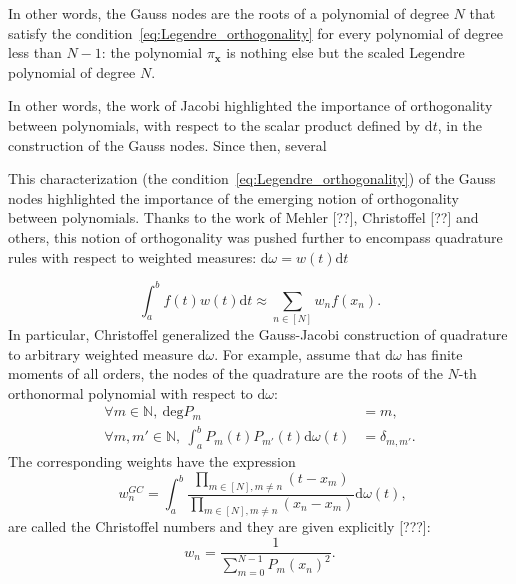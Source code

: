 \documentclass[twoside,11pt]{book}
\begin{document}


 In other words, the Gauss nodes are the roots of a polynomial of degree $N$ that satisfy the condition~\eqref{eq:Legendre_orthogonality} for every polynomial of degree less than $N-1$: the polynomial $\pi_{\bm{x}}$ is nothing else but the scaled Legendre polynomial of degree $N$.

 In other words, the work of Jacobi highlighted the importance of orthogonality 
between polynomials, with respect to the scalar product defined by $\mathrm{d}t$, in the construction of the Gauss nodes. Since then, several 


 This characterization (the condition~\eqref{eq:Legendre_orthogonality}) of the Gauss nodes highlighted the importance of the emerging notion of orthogonality between polynomials. Thanks to the work of Mehler [??], Christoffel [??] and others, this notion of orthogonality was pushed further to encompass quadrature rules with respect to  weighted measures: $\mathrm{d}\omega = w(t) \mathrm{d} t$ 

\begin{equation}
\int_{a}^{b}f(t)w(t)\mathrm{d}t \approx \sum\limits_{n \in [N]} w_{n}f(x_{n}).
\end{equation}
In particular, Christoffel generalized the Gauss-Jacobi construction of quadrature to arbitrary weighted measure $\mathrm{d}\omega$. For example, assume that $\mathrm{d}\omega$ has finite moments of all orders, the nodes of the quadrature are the roots of the $N$-th orthonormal polynomial with respect to $\mathrm{d}\omega$:
\begin{align}
\forall m \in \mathbb{N}, \: \mathrm{deg} P_{m} & = m, \\
\forall m,m' \in \mathbb{N}, \: \int_{a}^{b} P_{m}(t)P_{m'}(t) \mathrm{d}\omega(t) & = \delta_{m,m'}.
\end{align}
The corresponding weights have the expression
\begin{equation}
 \:\: w_{n}^{GC} = \int_{a}^{b} \frac{\prod\limits_{m \in [N], m \neq n }(t-x_{m})}{\prod\limits_{m \in [N], m \neq n }(x_{n}-x_{m})} \mathrm{d}\omega(t),
\end{equation}
are called the Christoffel numbers and they are given explicitly [???]: 
\begin{equation}
w_{n} = \frac{1}{\sum\limits_{m =0}^{N-1} P_{m}(x_{n})^{2}}.
\end{equation}
\end{document}
